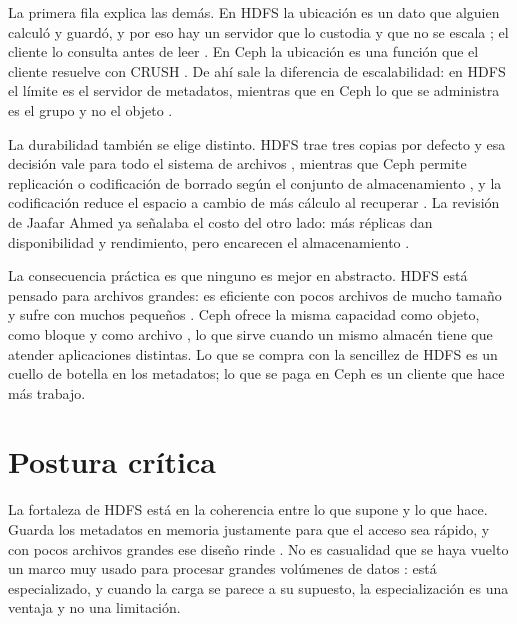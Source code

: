 \documentclass[12pt,a4paper]{article}
\begin{document}
La primera fila explica las demás. En HDFS la ubicación es un dato que alguien calculó y guardó, y por eso hay un servidor que lo custodia y que no se escala \cite[p.~2830]{dhulavvagol2023performance}; el cliente lo consulta antes de leer \cite[p.~11]{tchaye2019hpf}. En Ceph la ubicación es una función que el cliente resuelve con CRUSH \cite[p.~1128]{li2023ceph}. De ahí sale la diferencia de escalabilidad: en HDFS el límite es el servidor de metadatos, mientras que en Ceph lo que se administra es el grupo y no el objeto \cite[p.~4]{chum2021supporting}.

La durabilidad también se elige distinto. HDFS trae tres copias por defecto y esa decisión vale para todo el sistema de archivos \cite[p.~1]{tchaye2019hpf}, mientras que Ceph permite replicación o codificación de borrado según el conjunto de almacenamiento \cite[p.~3]{kim2021erasure}, y la codificación reduce el espacio a cambio de más cálculo al recuperar \cite[p.~1]{lei2024recovery}. La revisión de Jaafar Ahmed ya señalaba el costo del otro lado: más réplicas dan disponibilidad y rendimiento, pero encarecen el almacenamiento \cite[p.~173]{ahmed2023consistency}.

La consecuencia práctica es que ninguno es mejor en abstracto. HDFS está pensado para archivos grandes: es eficiente con pocos archivos de mucho tamaño y sufre con muchos pequeños \cite[p.~1]{tchaye2019hpf}. Ceph ofrece la misma capacidad como objeto, como bloque y como archivo \cite[p.~3]{chum2021supporting}, lo que sirve cuando un mismo almacén tiene que atender aplicaciones distintas. Lo que se compra con la sencillez de HDFS es un cuello de botella en los metadatos; lo que se paga en Ceph es un cliente que hace más trabajo.

\section{Postura crítica}
\label{sec:critica}

La fortaleza de HDFS está en la coherencia entre lo que supone y lo que hace. Guarda los metadatos en memoria justamente para que el acceso sea rápido, y con pocos archivos grandes ese diseño rinde \cite[p.~1]{tchaye2019hpf}. No es casualidad que se haya vuelto un marco muy usado para procesar grandes volúmenes de datos \cite[p.~2830]{dhulavvagol2023performance}: está especializado, y cuando la carga se parece a su supuesto, la especialización es una ventaja y no una limitación.
\end{document}
